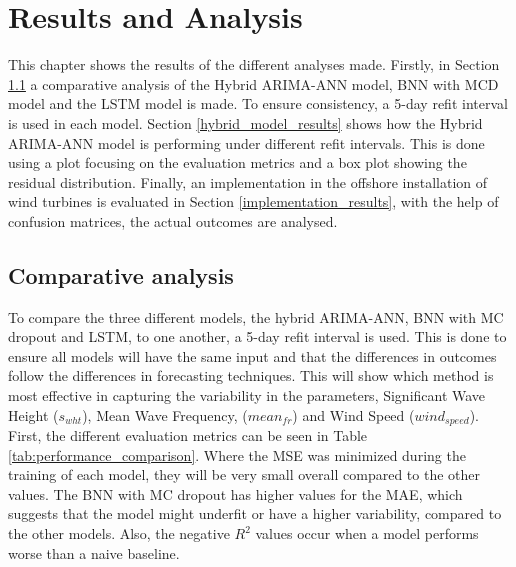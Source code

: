 \chapter{Results and Analysis}
This chapter shows the results of the different analyses made. Firstly, in Section \ref{comparitive_analysis} a comparative analysis of the Hybrid ARIMA-ANN model, BNN with MCD model and the LSTM model is made. To ensure consistency, a 5-day refit interval is used in each model. Section \ref{hybrid_model_results} shows how the Hybrid ARIMA-ANN model is performing under different refit intervals. This is done using a plot focusing on the evaluation metrics and a box plot showing the residual distribution. Finally, an implementation in the offshore installation of wind turbines is evaluated in Section \ref{implementation_results}, with the help of confusion matrices, the actual outcomes are analysed. 


\section{Comparative analysis}
\label{comparitive_analysis}
To compare the three different models, the hybrid ARIMA-ANN, BNN with MC dropout and LSTM, to one another, a 5-day refit interval is used. This is done to ensure all models will have the same input and that the differences in outcomes follow the differences in forecasting techniques. This will show which method is most effective in capturing the variability in the parameters, Significant Wave Height ($s_{wht}$), Mean Wave Frequency, ($mean_{fr}$) and Wind Speed ($wind_{speed}$). First, the different evaluation metrics can be seen in Table \ref{tab:performance_comparison}. Where the MSE was minimized during the training of each model, they will be very small overall compared to the other values. The BNN with MC dropout has higher values for the MAE, which suggests that the model might underfit or have a higher variability, compared to the other models. Also, the negative $R^2$ values occur when a model performs worse than a naive baseline. 

